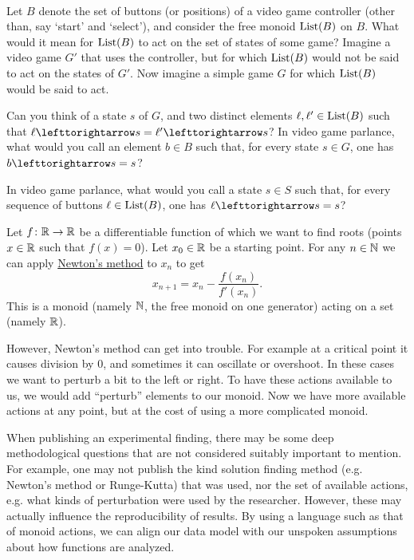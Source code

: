 \begin{exerciseRUS}\label{exc:clock}~
\end{exerciseRUS}

\begin{exerciseENG}
Let $B$ denote the set of buttons (or positions) of a video game controller (other than, say `start' and `select'), and consider the free monoid $\textnormal{List}(B)$ on $B$. 
\sexc What would it mean for $\textnormal{List}(B)$ to act on the set of states of some game? Imagine a video game $G'$ that uses the controller, but for which $\textnormal{List}(B)$ would not be said to act on the states of $G'$. Now imagine a simple game $G$ for which $\textnormal{List}(B)$ would be said to act.
\item Can you think of a state $s$ of $G$, and two distinct elements $\ell,\ell'\in\textnormal{List}(B)$ such that $\ell\acts s=\ell'\acts s$? In video game parlance, what would you call an element $b\in B$ such that, for every state $s\in G$, one has $b\acts s=s$? 
\item In video game parlance, what would you call a state $s\in S$ such that, for every sequence of buttons $\ell\in\textnormal{List}(B)$, one has $\ell\acts s=s$?
\endsexc
\end{exerciseENG}

\begin{exerciseRUS}
\end{exerciseRUS}

\begin{applicationENG}
Let $f\colon{\mathbb R}\rightarrow{\mathbb R}$ be a differentiable function of which we want to find roots (points $x\in{\mathbb R}$ such that $f(x)=0$). Let $x_0\in{\mathbb R}$ be a starting point. For any $n\in{\mathbb N}$ we can apply \href{http://en.wikipedia.org/wiki/Newton's_method}{\text Newton's method} to $x_n$ to get $$x_{n+1}=x_n-\frac{f(x_n)}{f'(x_n)}.$$ 
This is a monoid (namely ${\mathbb N}$, the free monoid on one generator) acting on a set (namely ${\mathbb R}$). 

However, Newton's method can get into trouble. For example at a critical point it causes division by 0, and sometimes it can oscillate or overshoot. In these cases we want to perturb a bit to the left or right. To have these actions available to us, we would add “perturb” elements to our monoid. Now we have more available actions at any point, but at the cost of using a more complicated monoid.

When publishing an experimental finding, there may be some deep methodological questions that are not considered suitably important to mention. For example, one may not publish the kind solution finding method (e.g. Newton's method or Runge-Kutta) that was used, nor the set of available actions, e.g. what kinds of perturbation were used by the researcher. However, these may actually influence the reproducibility of results. By using a language such as that of monoid actions, we can align our data model with our unspoken assumptions about how functions are analyzed.
\end{applicationENG}

